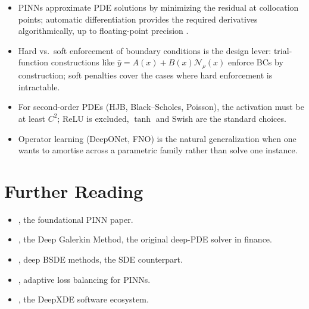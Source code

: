 \documentclass[11pt,a4paper]{report}
\begin{document}
\begin{keyinsightbox}
\begin{itemize}[itemsep=2pt, leftmargin=*]
\item PINNs approximate PDE solutions by minimizing the residual at collocation points; automatic differentiation provides the required derivatives algorithmically, up to floating-point precision \citep{raissi2019physics}.
\item Hard vs.\ soft enforcement of boundary conditions is the design lever: trial-function constructions like $\hat y = A(x) + B(x)\mathcal{N}_\rho(x)$ enforce BCs by construction; soft penalties cover the cases where hard enforcement is intractable.
\item For second-order PDEs (HJB, Black--Scholes, Poisson), the activation must be at least $C^2$; ReLU is excluded, $\tanh$ and Swish are the standard choices.
\item Operator learning (DeepONet, FNO) is the natural generalization when one wants to amortise across a parametric family rather than solve one instance.
\end{itemize}
\end{keyinsightbox}

\section*{Further Reading}
\begin{itemize}[itemsep=2pt]
\item \citet{raissi2019physics}, the foundational PINN paper.
\item \citet{sirignano2018dgm}, the Deep Galerkin Method, the original deep-PDE solver in finance.
\item \citet{e2017deep, han2018solving}, deep BSDE methods, the SDE counterpart.
\item \citet{wang2021understanding, bischof2025relobralo}, adaptive loss balancing for PINNs.
\item \citet{lu2021deepxde}, the DeepXDE software ecosystem.
\end{itemize}
\end{document}
